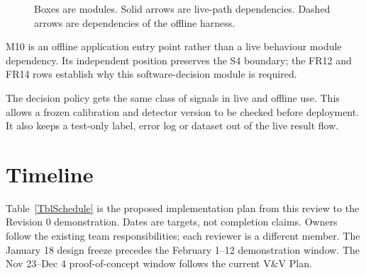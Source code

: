 \documentclass[12pt, titlepage]{article}
\begin{document}
\begin{figure}[H]
\centering
{}
\caption{Boxes are modules. Solid arrows are live-path dependencies. Dashed arrows are dependencies of the offline harness.}
\label{FigUH}
\end{figure}

M10 is an offline application entry point rather than a live behaviour module dependency. Its independent position preserves the S4 boundary; the FR12 and FR14 rows establish why this software-decision module is required.

The decision policy gets the same class of signals in live and offline use. This allows a frozen calibration and detector version to be checked before deployment. It also keeps a test-only label, error log or dataset out of the live result flow.

\section{Timeline}

Table~\ref{TblSchedule} is the proposed implementation plan from this review to the Revision 0 demonstration. Dates are targets, not completion claims. Owners follow the existing team responsibilities; each reviewer is a different member. The January 18 design freeze precedes the February 1--12 demonstration window. The Nov 23--Dec 4 proof-of-concept window follows the current V\&V Plan.
\end{document}
